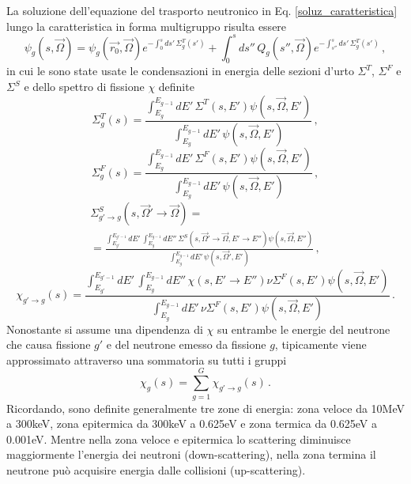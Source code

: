 La soluzione dell'equazione del trasporto neutronico  in Eq. \eqref{soluz_caratteristica} lungo la caratteristica  in forma multigruppo risulta essere
\begin{equation}
\psi_g(s,\vec{\Omega})=\psi_g(\vec{r_0},\vec{\Omega})e^{-\int_0^s 
ds'\,\Sigma_g^T(s')}+\int_0^s ds'' \, Q_g(s'',\vec{\Omega})e^{-\int_{s''}^s 
ds'\,\Sigma_g^T(s')} \,,
\end{equation}
in cui le sono state usate le condensazioni in energia delle sezioni d'urto 
$\Sigma^T$, $\Sigma^F$ e $\Sigma^S$ e dello spettro di fissione $\chi$ definite
\begin{equation}
\Sigma_g^T(s)=\frac{\int^{E_{g-1}}_{E_g} 
dE'\,\Sigma^T(s,E')\psi(s,\vec{\Omega},E')}{\int^{E_{g-1}}_{E_g} 
dE'\,\psi(s,\vec{\Omega},E')} \,,
\end{equation}
\begin{equation}
\Sigma_g^F(s)=\frac{\int^{E_{g-1}}_{E_g} 
dE'\,\Sigma^F(s,E')\psi(s,\vec{\Omega},E')}{\int^{E_{g-1}}_{E_g} 
dE'\,\psi(s,\vec{\Omega},E')} \,,
\end{equation}
\begin{multline}
\Sigma_{g'\rightarrow g}^S(s,\vec{\Omega}'\rightarrow \vec{\Omega})= \\
=\frac{\int^{E_{g'-1}}_{E_{g'}} dE'\, \int^{E_{g-1}}_{E_g} 
dE''\,\Sigma^S(s,\vec{\Omega}'\rightarrow \vec{\Omega},E'\rightarrow 
E'')\psi(s,\vec{\Omega},E'')}{\int^{E_{g-1}}_{E_g} 
dE'\,\psi(s,\vec{\Omega}',E')} \,,
\end{multline}
\begin{equation}
\chi_{g'\rightarrow g}(s)=\frac{\int^{E_{g'-1}}_{E_{g'}} dE'\, 
\int^{E_{g-1}}_{E_g} dE''\,\chi(s,E'\rightarrow E'')\nu 
\Sigma^F(s,E')\psi(s,\vec{\Omega},E')}{\int^{E_{g-1}}_{E_g} dE'\,\nu 
\Sigma^F(s,E')\psi(s,\vec{\Omega},E')} \,.
\end{equation}
Nonostante si assume una dipendenza di $\chi$ su entrambe le energie del 
neutrone che causa fissione $g'$ e del neutrone emesso da fissione $g$, 
tipicamente viene approssimato attraverso una sommatoria su tutti i gruppi
\begin{equation}
\chi_g(s)=\sum_{g=1}^G \chi_{g'\rightarrow g}(s) \,.
\end{equation}
Ricordando, sono definite generalmente tre zone di energia: zona veloce da 10MeV a 300keV, 
zona epitermica da 300keV a 0.625eV e zona termica da 0.625eV a 0.001eV. Mentre 
nella zona veloce e epitermica lo scattering diminuisce maggiormente l'energia 
dei neutroni (down-scattering), nella zona termina il neutrone può acquisire 
energia dalle collisioni (up-scattering). 



